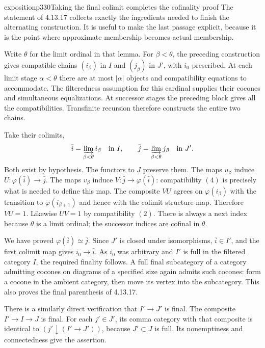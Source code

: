 \begin{dcomment}{exposition}{p330}{Taking the final colimit completes the cofinality proof}
The statement of 4.13.17 collects exactly the ingredients needed to finish the alternating construction. It is useful to make the last passage explicit, because it is the point where approximate membership becomes actual membership.

Write $\theta$ for the limit ordinal in that lemma. For $\beta<\theta$, the preceding construction gives compatible chains $(i_\beta)$ in $I$ and $(j_\beta)$ in $J'$, with $i_0$ prescribed. At each limit stage $\alpha<\theta$ there are at most $\lvert\alpha\rvert$ objects and compatibility equations to accommodate. The filteredness assumption for this cardinal supplies their cocones and simultaneous equalizations. At successor stages the preceding block gives all the compatibilities. Transfinite recursion therefore constructs the entire two chains.

Take their colimits,
\[
 \bar i=\varinjlim_{\beta<\theta}i_\beta\quad\hbox{in }I,
 \qquad
 \bar j=\varinjlim_{\beta<\theta}j_\beta\quad\hbox{in }J'.
\]
Both exist by hypothesis. The functors to $J$ preserve them. The maps $u_\beta$ induce $U:\varphi(\bar i)\to\bar j$. The maps $v_\beta$ induce $V:\bar j\to\varphi(\bar i)$: compatibility $(4)$ is precisely what is needed to define this map. The composite $VU$ agrees on $\varphi(i_\beta)$ with the transition to $\varphi(i_{\beta+1})$ and hence with the colimit structure map. Therefore $VU=1$. Likewise $UV=1$ by compatibility $(2)$. There is always a next index because $\theta$ is a limit ordinal; the successor indices are cofinal in $\theta$.

We have proved $\varphi(\bar i)\simeq\bar j$. Since $J'$ is closed under isomorphisms, $\bar i\in I'$, and the first colimit map gives $i_0\to\bar i$. As $i_0$ was arbitrary and $I'$ is full in the filtered category $I$, the required finality follows. A full final subcategory of a category admitting cocones on diagrams of a specified size again admits such cocones: form a cocone in the ambient category, then move its vertex into the subcategory. This also proves the final parenthesis of 4.13.17.

There is a similarly direct verification that $I'\to J'$ is final. The composite $I'\to I\to J$ is final. For each $j'\in J'$, its comma category with that composite is identical to $(j'\downarrow (I'\to J'))$, because $J'\subset J$ is full. Its nonemptiness and connectedness give the assertion.


\end{dcomment}
